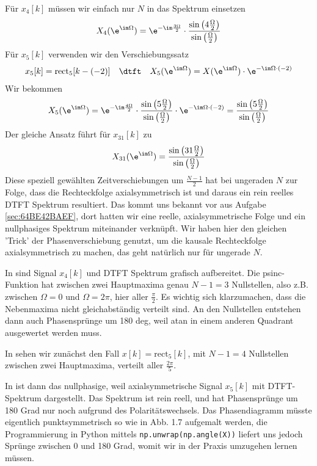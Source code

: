 \begin{Loesung}
Für $x_4[k]$ müssen wir einfach nur $N$ in das Spektrum einsetzen
\begin{equation}
X_4(\e^{\im\Omega})=\e^{-\im\frac{3\Omega}{2}}\cdot\frac{\sin\left(4\frac{\Omega}{2}\right)}{\sin\left(\frac{\Omega}{2}\right)}
\end{equation}
%
Für $x_5[k]$ verwenden wir den Verschiebungssatz
\begin{align}
x_5[k] = \mathrm{rect}_5[k-(-2)] \quad\dtft\quad X_5(\e^{\im\Omega}) = X(\e^{\im\Omega}) \cdot \e^{-\im\Omega\cdot (-2)}
\end{align}
Wir bekommen
\begin{equation}
X_5(\e^{\im\Omega})
=\e^{-\im\frac{4\Omega}{2}}\cdot\frac{\sin\left(5\frac{\Omega}{2}\right)}{\sin\left(\frac{\Omega}{2}\right)}  \cdot \e^{-\im\Omega\cdot (-2)}=
\frac{\sin\left(5\frac{\Omega}{2}\right)}{\sin\left(\frac{\Omega}{2}\right)}
\end{equation}
Der gleiche Ansatz führt für $x_{31}[k]$ zu
\begin{equation}
X_{31}(\e^{\im\Omega}) = \frac{\sin\left(31\frac{\Omega}{2}\right)}{\sin\left(\frac{\Omega}{2}\right)}
\end{equation}
%
Diese speziell gewählten Zeitverschiebungen um $\frac{N-1}{2}$ hat bei ungeraden
$N$ zur Folge, dass die Rechteckfolge axialsymmetrisch ist und daraus
ein rein reelles DTFT Spektrum resultiert. Das kommt uns bekannt vor aus
Aufgabe \ref{sec:64BE42BAEF}, dort hatten wir
eine reelle, axialsymmetrische Folge und ein nullphasiges Spektrum miteinander
verknüpft. Wir haben hier den gleichen 'Trick' der Phasenverschiebung genutzt,
um die kausale Rechteckfolge axialsymmetrisch zu machen, das geht natürlich
nur für ungerade $N$.
%

In  sind Signal $x_4[k]$ und DTFT
Spektrum grafisch aufbereitet. Die psinc-Funktion hat zwischen zwei Hauptmaxima
genau $N-1=3$ Nullstellen, also z.B. zwischen $\Omega=0$ und $\Omega=2\pi$,
hier aller $\frac{\pi}{2}$. Es wichtig sich klarzumachen, dass die Nebenmaxima
nicht gleichabständig verteilt sind.
%
An den Nullstellen entstehen dann auch Phasensprünge um 180 deg, weil
atan in einem anderen Quadrant ausgewertet werden muss.

In  sehen wir zunächst den Fall
$x[k] = \mathrm{rect}_5[k]$, mit $N-1=4$ Nullstellen zwischen zwei Hauptmaxima,
verteilt aller $\frac{2\pi}{5}$.

In  ist dann das nullphasige, weil axialsymmetrische
Signal $x_5[k]$ mit DTFT-Spektrum dargestellt.
Das Spektrum ist rein reell, und hat Phasensprünge um 180 Grad nur
noch aufgrund des Polaritätswechsels. Das Phasendiagramm müsste eigentlich
punktsymmetrisch so wie in Abb. 1.7 aufgemalt werden, die Programmierung in Python
mittels \texttt{np.unwrap(np.angle(X))} liefert uns jedoch Sprünge zwischen 0 und 180 Grad,
womit wir in der Praxis umzugehen lernen müssen.


\end{Loesung}
